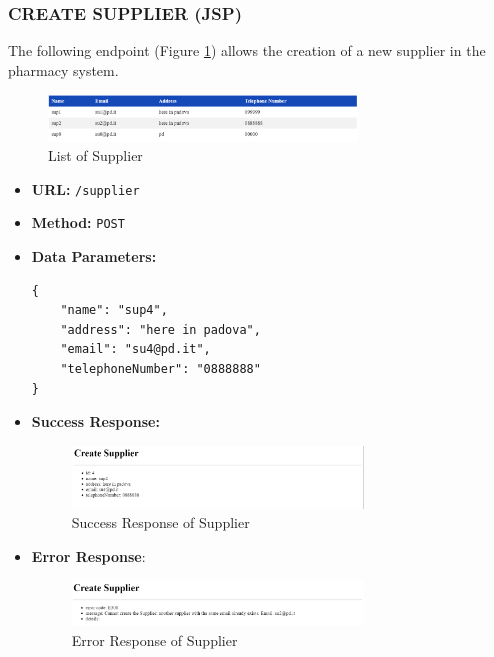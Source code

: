 \subsubsection*{CREATE SUPPLIER (JSP)}
The following endpoint (Figure \ref{fig:supplierList}) allows the creation of a new supplier in the pharmacy system.
\begin{figure}[H]
    \centering
    \includegraphics[width=0.73\textwidth]{sections/BLL/supplierList.png}
    \caption{List of Supplier}
    \label{fig:supplierList}
\end{figure}

\begin{itemize}
    \item \textbf{URL:}
    \newline \hspace*{1cm} \texttt{/supplier}  
    \item \textbf{Method:}
    \newline \hspace*{1cm}\texttt{POST}
    \item \textbf{Data Parameters:}
\begin{lstlisting}[breaklines]
{
    "name": "sup4",
    "address": "here in padova",
    "email": "su4@pd.it",
    "telephoneNumber": "0888888"
}

\end{lstlisting}
    \item \textbf{Success Response:}
\begin{figure}[H]
    \centering
    \includegraphics[width=0.73\textwidth]{sections/BLL/supplierSuccess.png}
    \caption{Success Response of Supplier}
    \label{fig:my_label}
\end{figure}
    \item \textbf{Error Response}:
\begin{figure}[H]
    \centering
    \includegraphics[width=0.73\textwidth]{sections/BLL/supplierError.png}
    \caption{Error Response of Supplier}
    \label{fig:my_label}
\end{figure}
\end{itemize}
